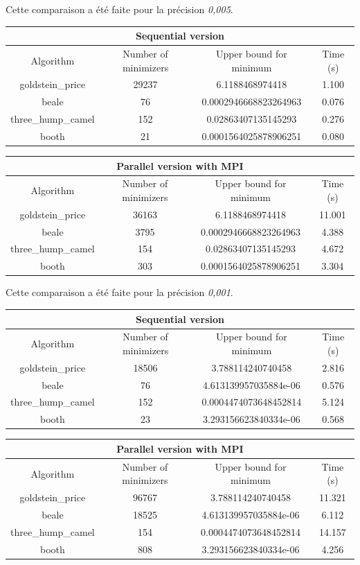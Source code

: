 \documentclass[a4paper,10pt]{article}
\begin{document}
Cette comparaison a été faite pour la précision \emph{0,005}.

\begin{tabular}{|c|c|c|c|}
\hline
\multicolumn{4}{|c|}{Sequential version}\\
\hline
Algorithm & Number of minimizers & Upper bound for minimum & Time (s) \\
\hline
goldstein\_price & 29237 & 6.1188468974418 & 1.100\\
\hline
beale & 76 & 0.0002946668823264963 & 0.076\\
\hline
three\_hump\_camel & 152 & 0.02863407135145293 & 0.276\\
\hline
booth & 21 & 0.0001564025878906251 & 0.080\\
\hline
\end{tabular}

\begin{tabular}{|c|c|c|c|}
\hline
\multicolumn{4}{|c|}{Parallel version with MPI}\\
\hline
Algorithm & Number of minimizers & Upper bound for minimum & Time (s) \\
\hline
goldstein\_price & 36163 & 6.1188468974418 & 11.001\\
\hline
beale & 3795 & 0.0002946668823264963 & 4.388\\
\hline
three\_hump\_camel & 154 & 0.02863407135145293 & 4.672\\
\hline
booth & 303 & 0.0001564025878906251 & 3.304\\
\hline
\end{tabular}

Cette comparaison a été faite pour la précision \emph{0,001}.

\begin{tabular}{|c|c|c|c|}
\hline
\multicolumn{4}{|c|}{Sequential version}\\
\hline
Algorithm & Number of minimizers & Upper bound for minimum & Time (s) \\
\hline
goldstein\_price & 18506 & 3.788114240740458 & 2.816\\
\hline
beale & 76 & 4.613139957035884e-06 & 0.576\\
\hline
three\_hump\_camel & 152 & 0.0004474073648452814 & 5.124\\
\hline
booth & 23 & 3.293156623840334e-06 & 0.568\\
\hline
\end{tabular}

\begin{tabular}{|c|c|c|c|}
\hline
\multicolumn{4}{|c|}{Parallel version with MPI}\\
\hline
Algorithm & Number of minimizers & Upper bound for minimum & Time (s) \\
\hline
goldstein\_price & 96767 & 3.788114240740458 & 11.321\\
\hline
beale & 18525 & 4.613139957035884e-06 & 6.112\\
\hline
three\_hump\_camel & 154 & 0.0004474073648452814 & 14.157\\
\hline
booth & 808 & 3.293156623840334e-06 & 4.256\\
\hline
\end{tabular}
\end{document}
